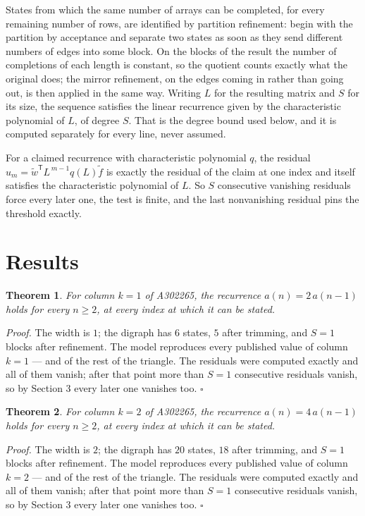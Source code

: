 \documentclass[11pt]{article}
\newtheorem{theorem}{Theorem}
\theoremstyle{definition}
\begin{document}
States from which the same number of arrays can be completed, for every remaining number of rows, are identified by partition refinement: begin with the partition by acceptance and separate two states as soon as they send different numbers of edges into some block. On the blocks of the result the number of completions of each length is constant, so the quotient counts exactly what the original does; the mirror refinement, on the edges coming in rather than going out, is then applied in the same way. Writing $L$ for the resulting matrix and $S$ for its size, the sequence satisfies the linear recurrence given by the characteristic polynomial of $L$, of degree $S$. That is the degree bound used below, and it is computed separately for every line, never assumed.

For a claimed recurrence with characteristic polynomial $q$, the residual $u_m = \tilde w^{\mathsf T}L^{\,m-1}q(L)\tilde f$ is exactly the residual of the claim at one index and itself satisfies the characteristic polynomial of $L$. So $S$ consecutive vanishing residuals force every later one, the test is finite, and the last nonvanishing residual pins the threshold exactly.

\section{Results}

\begin{theorem} For column $k = 1$ of A302265, the recurrence $a(n) = 2\,a(n-1)$ holds for every $n \ge 2$, at every index at which it can be stated.\end{theorem}

{\itshape Proof.} The width is $1$; the digraph has $6$ states, $5$ after trimming, and $S = 1$ blocks after refinement. The model reproduces every published value of column $k = 1$ --- and of the rest of the triangle. The residuals were computed exactly and all of them vanish; after that point more than $S = 1$ consecutive residuals vanish, so by Section 3 every later one vanishes too. $\square$

\begin{theorem} For column $k = 2$ of A302265, the recurrence $a(n) = 4\,a(n-1)$ holds for every $n \ge 2$, at every index at which it can be stated.\end{theorem}

{\itshape Proof.} The width is $2$; the digraph has $20$ states, $18$ after trimming, and $S = 1$ blocks after refinement. The model reproduces every published value of column $k = 2$ --- and of the rest of the triangle. The residuals were computed exactly and all of them vanish; after that point more than $S = 1$ consecutive residuals vanish, so by Section 3 every later one vanishes too. $\square$
\end{document}
